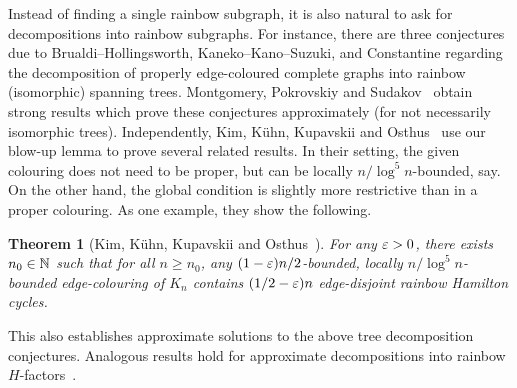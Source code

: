\documentclass[10pt]{amsart}
\newtheorem{theorem}[algorithm]{Theorem}
\theoremstyle{definition}
\theoremstyle{claimstyle}
\theoremstyle{stepstyle}
\numberwithin{equation}{section}
\begin{document}
Instead of finding a single rainbow subgraph, it is also natural to ask for decompositions into rainbow subgraphs. For instance, there are three conjectures due to Brualdi--Hollingsworth, Kaneko--Kano--Suzuki, and Constantine regarding the decomposition of properly edge-coloured complete graphs into rainbow (isomorphic) spanning trees. Montgomery, Pokrovskiy and Sudakov~\cite{MPS:18b} obtain strong results which prove these conjectures approximately (for not necessarily isomorphic trees).
Independently, Kim, K\"uhn, Kupavskii and Osthus~\cite{KKKO:18} use our blow-up lemma to prove several related results. In their setting, the given colouring does not need to be proper, but can be locally $n/\log^5 n$-bounded, say. On the other hand, the global condition is slightly more restrictive than in a proper colouring.
As one example, they show the following.

\begin{theorem}[Kim, K\"uhn, Kupavskii and Osthus~\cite{KKKO:18}]
For any ${\varepsilon} > 0$, there exists $n_0\in \mathbb{N}$ such that for all $n\geq  n_0$, any $(1 - {\varepsilon})n/2$-bounded, locally $n/\log^5 n$-bounded edge-colouring of $K_n$ contains $(1/2- {\varepsilon})n$ edge-disjoint rainbow Hamilton cycles.
\end{theorem}
This also establishes approximate solutions to the above tree decomposition conjectures. 
Analogous results hold for approximate decompositions into rainbow $H$-factors~\cite{KKKO:18}.


%
\end{document}
